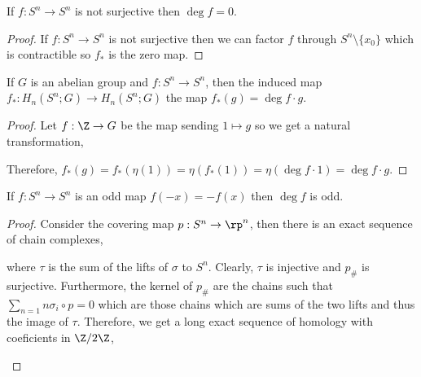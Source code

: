 \documentclass[12pt]{extarticle}
\begin{document}
\begin{proposition}
If $f : S^n \to S^n$ is not surjective then $\deg{f} = 0$. 
\end{proposition}

\begin{proof}
If $f : S^n \to S^n$ is not surjective then we can factor $f$ through $S^n \setminus \{x_0\}$ which is contractible so $f_*$ is the zero map. 
\end{proof}


\begin{lemma}
If $G$ is an abelian group and $f : S^n \to S^n$, then the induced map $f_* : H_n(S^n; G) \to H_n(S^n; G)$ the map $f_*(g) = \deg{f} \cdot g$. 
\end{lemma}

\begin{proof}
Let $f : \Z \to G$ be the map sending $1 \mapsto g$ so we get a natural transformation,
\begin{center}
\end{center}
Therefore, $f_*(g) = f_*(\eta(1)) = \eta(f_*(1)) = \eta( \deg{f} \cdot 1) = \deg{f} \cdot g$. 
\end{proof}

\begin{proposition}
If $f : S^n \to S^n$ is an odd map $f(-x) = - f(x)$ then $\deg{f}$ is odd. 
\end{proposition}

\begin{proof}
Consider the covering map $p : S^n \to \rp^n$, then there is an exact sequence of chain complexes,
\begin{center}
\end{center}
where $\tau$ is the sum of the lifts of $\sigma$ to $S^n$. Clearly, $\tau$ is injective and $p_{\#}$ is surjective. Furthermore, the kernel of $p_{\#}$ are the chains such that $\sum_{n = 1} n \sigma_i \circ p = 0$ which are those chains which are sums of the two lifts and thus the image of $\tau$. Therefore, we get a long exact sequence of homology with coeficients in $\Z / 2 \Z$,

\begin{center}
\end{center}
\end{proof}
\end{document}
